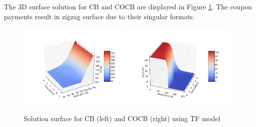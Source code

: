 \documentclass[12pt]{article}
\begin{document}
The 3D surface solution for CB and COCB are displayed in Figure \ref{fig:surf}. The coupon payments result in zigzag surface due to their singular formats.
\begin{figure}[!htbp]
\includegraphics[width=0.49\textwidth]{Figures/CBsurf}
\includegraphics[width=0.49\textwidth]{Figures/COCBsurf}
\caption{Solution surface for CB (left) and COCB (right) using TF model}
\label{fig:surf}
\end{figure}
\end{document}
